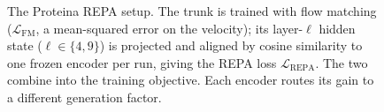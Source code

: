 \begin{figure}[tbp]
\caption{The Proteina REPA setup. The trunk is trained with flow matching ($\mathcal{L}_{\text{FM}}$, a mean-squared error on the velocity); its layer-$\ell$ hidden state ($\ell \in \{4,9\}$) is projected and aligned by cosine similarity to one frozen encoder per run, giving the REPA loss $\mathcal{L}_{\text{REPA}}$. The two combine into the training objective. Each encoder routes its gain to a different generation factor.}
\label{fig:proteina-setup}
\end{figure}

